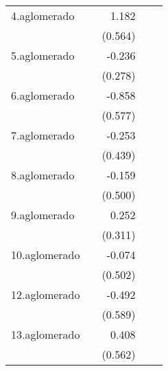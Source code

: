 {\begin{longtable}{l*{4}{D{.}{.}{-1}}}
\addlinespace
4.aglomerado&                     &       1.182\sym{*}  &                     &                     \\
            &                     &     (0.564)         &                     &                     \\
\addlinespace
5.aglomerado&                     &      -0.236         &                     &                     \\
            &                     &     (0.278)         &                     &                     \\
\addlinespace
6.aglomerado&                     &      -0.858         &                     &                     \\
            &                     &     (0.577)         &                     &                     \\
\addlinespace
7.aglomerado&                     &      -0.253         &                     &                     \\
            &                     &     (0.439)         &                     &                     \\
\addlinespace
8.aglomerado&                     &      -0.159         &                     &                     \\
            &                     &     (0.500)         &                     &                     \\
\addlinespace
9.aglomerado&                     &       0.252         &                     &                     \\
            &                     &     (0.311)         &                     &                     \\
\addlinespace
10.aglomerado&                     &      -0.074         &                     &                     \\
            &                     &     (0.502)         &                     &                     \\
\addlinespace
12.aglomerado&                     &      -0.492         &                     &                     \\
            &                     &     (0.589)         &                     &                     \\
\addlinespace
13.aglomerado&                     &       0.408         &                     &                     \\
            &                     &     (0.562)         &                     &                     \\

\end{longtable}}
